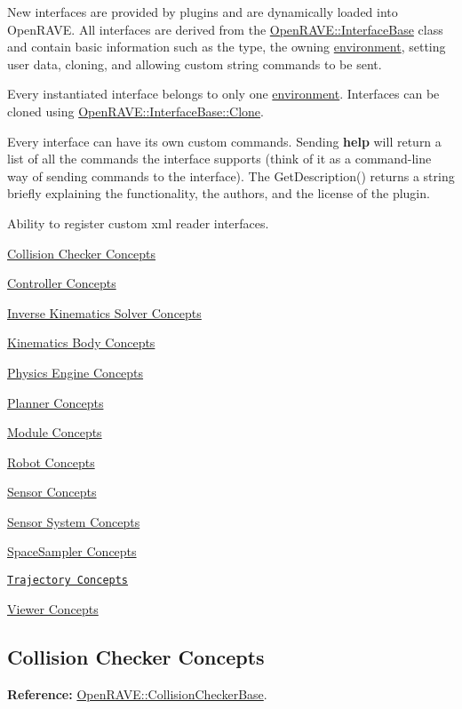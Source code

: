 New interfaces are provided by plugins and are dynamically loaded into OpenRAVE. All interfaces are derived from the \hyperlink{classOpenRAVE_1_1InterfaceBase}{OpenRAVE::InterfaceBase} class and contain basic information such as the type, the owning \hyperlink{classOpenRAVE_1_1EnvironmentBase}{environment}, setting user data, cloning, and allowing custom string commands to be sent.

Every instantiated interface belongs to only one \hyperlink{classOpenRAVE_1_1EnvironmentBase}{environment}. Interfaces can be cloned using \hyperlink{classOpenRAVE_1_1InterfaceBase_aadffdb83bc22dcdd5dd50c27d1bb5496}{OpenRAVE::InterfaceBase::Clone}.

Every interface can have its own custom commands. Sending {\bfseries help} will return a list of all the commands the interface supports (think of it as a command-\/line way of sending commands to the interface). The GetDescription() returns a string briefly explaining the functionality, the authors, and the license of the plugin.

Ability to register custom xml reader interfaces.


\begin{DoxyItemize}
\item \hyperlink{arch__collisionchecker}{Collision Checker Concepts}
\item \hyperlink{arch__controller}{Controller Concepts}
\item \hyperlink{arch__iksolver}{Inverse Kinematics Solver Concepts}
\item \hyperlink{arch__kinbody}{Kinematics Body Concepts}
\item \hyperlink{arch__physicsengine}{Physics Engine Concepts}
\item \hyperlink{arch__planner}{Planner Concepts}
\item \hyperlink{arch__module}{Module Concepts}
\item \hyperlink{arch__robot}{Robot Concepts}
\item \hyperlink{arch__sensor}{Sensor Concepts}
\item \hyperlink{arch__sensorsystem}{Sensor System Concepts}
\item \hyperlink{arch__spacesampler}{SpaceSampler Concepts}
\item \href{../main/architecture/trajectory.html}{\tt Trajectory Concepts}
\item \hyperlink{arch__viewer}{Viewer Concepts} 
\end{DoxyItemize}\hypertarget{arch_collisionchecker}{}\subsection{Collision Checker Concepts}\label{arch_collisionchecker}
{\bfseries Reference:} \hyperlink{classOpenRAVE_1_1CollisionCheckerBase}{OpenRAVE::CollisionCheckerBase}.

